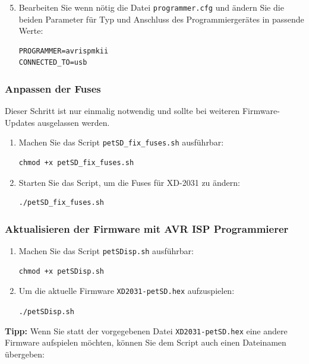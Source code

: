 \documentclass[10pt,a4paper]{scrartcl}		%
\begin{document}
\begin{enumerate}
\setcounter{enumi}{4}
\item Bearbeiten Sie wenn nötig die Datei \texttt{programmer.cfg} 
und ändern Sie die beiden Parameter für Typ und Anschluss des 
Programmiergerätes in pas\-sende Werte:
\begin{verbatim}
PROGRAMMER=avrispmkii
CONNECTED_TO=usb
\end{verbatim}
\end{enumerate}

\subsubsection*{Anpassen der Fuses}
Dieser Schritt ist nur einmalig notwendig und sollte bei
weiteren Firmware-Updates ausgelassen werden.
\begin{enumerate}
\item Machen Sie das Script \texttt{petSD\_fix\_fuses.sh} ausführbar:
\begin{verbatim}
chmod +x petSD_fix_fuses.sh
\end{verbatim}

\item Starten Sie das Script, um die Fuses für XD-2031 zu ändern:
\begin{verbatim}
./petSD_fix_fuses.sh
\end{verbatim}

\end{enumerate}

\subsubsection*{Aktualisieren der Firmware mit AVR ISP Programmierer}

\begin{enumerate}
\item Machen Sie das Script \texttt{petSDisp.sh} ausführbar:
\begin{verbatim}
chmod +x petSDisp.sh
\end{verbatim}

\item Um die aktuelle Firmware \texttt{XD2031-petSD.hex} aufzuspielen:

\texttt{./petSDisp.sh}
\end{enumerate}

\textbf{Tipp:} Wenn Sie statt der vorgegebenen Datei 
\texttt{XD2031-petSD.hex}
eine andere Firmware aufspielen möchten, können Sie
dem Script auch einen Dateinamen übergeben:
\end{document}
